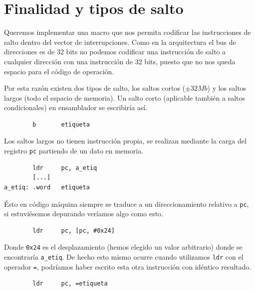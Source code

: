 \pagestyle{fancy}
\fancyhead[LE,RO]{\thepage}
\fancyhead[LO]{\nouppercase{\rightmark}}

\label{chp:MacroADDEXC}
\minitoc

\section{Finalidad y tipos de salto}

Queremos implementar una macro que nos permita codificar las
instrucciones de salto dentro del vector de interrupciones. Como en
la arquitectura el bus de direcciones es de 32 bits no podemos
codificar una instrucción de salto a cualquier dirección con
una instrucción de 32 bits, puesto que no nos queda espacio
para el código de operación.

Por esta razón existen dos tipos de salto, los saltos cortos
($\pm 32Mb$) y los saltos largos (todo el espacio de memoria). Un
salto corto (aplicable también a saltos condicionales) en
ensamblador se escribiría así.

\begin{lstlisting}
        b       etiqueta
\end{lstlisting}

Los saltos largos no tienen instrucción propia, se realizan mediante
la carga del registro {\tt pc} partiendo de un dato en memoria.

\newpage
\begin{lstlisting}
        ldr     pc, a_etiq
        [...]
a_etiq: .word   etiqueta
\end{lstlisting}

Ésto en código máquina siempre se traduce a un direccionamiento
relativo a {\tt pc}, si estuviésemos depurando veríamos algo como
esto.

\begin{lstlisting}
        ldr     pc, [pc, #0x24]
\end{lstlisting}

Donde {\tt 0x24} es el desplazamiento (hemos elegido un valor arbitrario)
donde se encontraría {\tt a\_etiq}. De hecho esto mismo ocurre cuando utilizamos
{\tt ldr} con el operador {\tt =}, podríamos haber escrito esta otra instrucción
con idéntico resultado.

\begin{lstlisting}
        ldr     pc, =etiqueta
\end{lstlisting}

